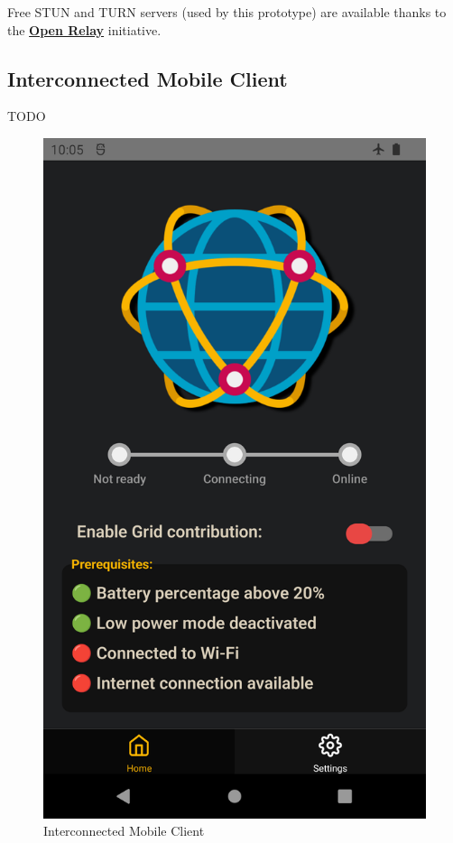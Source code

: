 Free STUN and TURN servers (used by this prototype) are available thanks to the \textbf{\href{https://www.metered.ca/tools/openrelay/}{Open Relay}} initiative.

\subsection{Interconnected Mobile Client}
TODO

\begin{figure}[!ht]
    \centering
    \includegraphics[scale=0.15]{document/chapters/chapter_7/images/interconnected_mobile_home.png}
    \caption{Interconnected Mobile Client}
    \label{fig:interconnected_mobile_home}
\end{figure}

